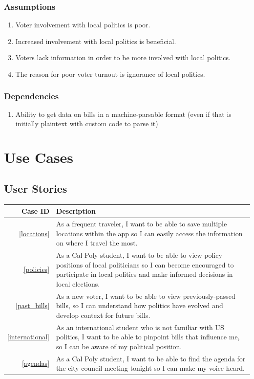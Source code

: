\documentclass[12pt,oneside,letterpaper]{article}
\begin{document}
\subsubsection{Assumptions}
\begin{enumerate}
\item Voter involvement with local politics is poor.
\item Increased involvement with local politics is beneficial.
\item Voters lack information in order to be more involved with local politics.
\item The reason for poor voter turnout is ignorance of local politics.
\end{enumerate}

\subsubsection{Dependencies}
\begin{enumerate}
\item Ability to get data on bills in a machine-parsable format (even if that is initially plaintext with custom code to parse it)
\end{enumerate}

\section{Use Cases}
\subsection{User Stories}
\begin{longtabu}{|r|X|}
  \hline
  Case ID & Description \\
  \hline
  \cref{locations} & As a frequent traveler, I want to be able to save
  multiple locations within the app so I can easily access the
  information on where I travel the most. \\
  \hline
  \cref{policies} & As a Cal Poly student, I want to be able to view
  policy positions of local politicians so I can become encouraged to
  participate in local politics and make informed decisions in local
  elections. \\
  \hline
  \cref{past_bills} & As a new voter, I want to be able to view
  previously-passed bills, so I can understand how politics have evolved
  and develop context for future bills. \\
  \hline
  \cref{international} & As an international student who is not
  familiar with US politics, I want to be able to pinpoint bills that
  influence me, so I can be aware of my political position.\\
  \hline
  \cref{agendas} & As a Cal Poly student, I want to be able to
  find the agenda for the city council meeting
  tonight so I can make my voice heard. \\
  \hline
\end{longtabu}
\end{document}
